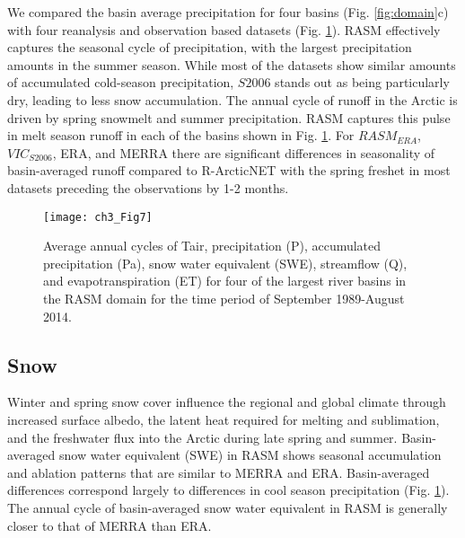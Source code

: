 We compared the basin average precipitation for four basins (Fig. \ref{fig:domain}c) with four reanalysis and observation based datasets (Fig. \ref{fig:water_cycle}).
RASM effectively captures the seasonal cycle of precipitation, with the largest precipitation amounts in the summer season.
While most of the datasets show similar amounts of accumulated cold-season precipitation, $S2006$ stands out as being particularly dry, leading to less snow accumulation.
The annual cycle of runoff in the Arctic is driven by spring snowmelt and summer precipitation.
RASM captures this pulse in melt season runoff in each of the basins shown in Fig. \ref{fig:water_cycle}.
For $RASM_{ERA}$, $VIC_{S2006}$, ERA, and MERRA there are significant differences in seasonality of basin-averaged runoff compared to R-ArcticNET with the spring freshet in most datasets preceding the observations by 1-2 months.

\begin{figure}
  \centering
  \texttt{[image: ch3\_Fig7]}
  \caption{Average annual cycles of Tair, precipitation (P), accumulated precipitation (Pa), snow water equivalent (SWE), streamflow (Q), and evapotranspiration (ET) for four of the largest river basins in the RASM domain for the time period of September 1989-August 2014.}
  \label{fig:water_cycle}
\end{figure}

\subsection{Snow}

Winter and spring snow cover influence the regional and global climate through increased surface albedo, the latent heat required for melting and sublimation, and the freshwater flux into the Arctic during late spring and summer.
Basin-averaged snow water equivalent (SWE) in RASM shows seasonal accumulation and ablation patterns that are similar to MERRA and ERA.
Basin-averaged differences correspond largely to differences in cool season precipitation (Fig. \ref{fig:water_cycle}).
The annual cycle of basin-averaged snow water equivalent in RASM is generally closer to that of MERRA than ERA.

